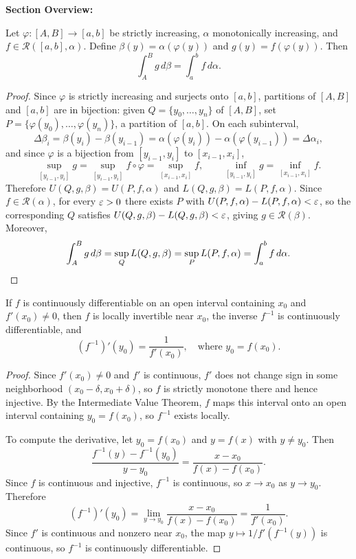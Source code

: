 \documentclass[../master/master.tex]{subfiles}
\begin{document}
\begin{summarybox}
\textbf{Section Overview:}
\end{summarybox}

\begin{theorem}
Let $\varphi:[A,B] \to [a,b]$ be strictly increasing, $\alpha$ monotonically increasing, and $f \in \mathscr{R}([a,b], \alpha)$. Define $\beta(y) = \alpha(\varphi(y))$ and $g(y) = f(\varphi(y))$. Then
\[
\int_A^B g\,d\beta = \int_a^b f\,d\alpha.
\]
\end{theorem}

\begin{proof}
Since $\varphi$ is strictly increasing and surjects onto $[a,b]$, partitions of $[A,B]$ and $[a,b]$ are in bijection: given $Q = \{y_0, \ldots, y_n\}$ of $[A,B]$, set $P = \{\varphi(y_0), \ldots, \varphi(y_n)\}$, a partition of $[a,b]$. On each subinterval,
\[
\Delta\beta_i = \beta(y_i) - \beta(y_{i-1}) = \alpha(\varphi(y_i)) - \alpha(\varphi(y_{i-1})) = \Delta\alpha_i,
\]
and since $\varphi$ is a bijection from $[y_{i-1}, y_i]$ to $[x_{i-1}, x_i]$,
\[
\sup_{[y_{i-1}, y_i]} g = \sup_{[y_{i-1}, y_i]} f \circ \varphi = \sup_{[x_{i-1}, x_i]} f, \qquad \inf_{[y_{i-1}, y_i]} g = \inf_{[x_{i-1}, x_i]} f.
\]
Therefore $U(Q, g, \beta) = U(P, f, \alpha)$ and $L(Q, g, \beta) = L(P, f, \alpha)$. Since $f \in \mathscr{R}(\alpha)$, for every $\varepsilon > 0$ there exists $P$ with $U(P,f,\alpha) - L(P,f,\alpha) < \varepsilon$, so the corresponding $Q$ satisfies $U(Q,g,\beta) - L(Q,g,\beta) < \varepsilon$, giving $g \in \mathscr{R}(\beta)$. Moreover,
\[
\int_A^B g\,d\beta = \sup_Q L(Q,g,\beta) = \sup_P L(P,f,\alpha) = \int_a^b f\,d\alpha. \qedhere
\]
\end{proof}

\begin{theorem}
If $f$ is continuously differentiable on an open interval containing $x_0$ and $f'(x_0) \neq 0$, then $f$ is locally invertible near $x_0$, the inverse $f^{-1}$ is continuously differentiable, and
\[
(f^{-1})'(y_0) = \frac{1}{f'(x_0)}, \quad \text{where } y_0 = f(x_0).
\]
\end{theorem}

\begin{proof}
Since $f'(x_0) \neq 0$ and $f'$ is continuous, $f'$ does not change sign in some neighborhood $(x_0 - \delta, x_0 + \delta)$, so $f$ is strictly monotone there and hence injective. By the Intermediate Value Theorem, $f$ maps this interval onto an open interval containing $y_0 = f(x_0)$, so $f^{-1}$ exists locally.

To compute the derivative, let $y_0 = f(x_0)$ and $y = f(x)$ with $y \neq y_0$. Then
\[
\frac{f^{-1}(y) - f^{-1}(y_0)}{y - y_0} = \frac{x - x_0}{f(x) - f(x_0)}.
\]
Since $f$ is continuous and injective, $f^{-1}$ is continuous, so $x \to x_0$ as $y \to y_0$. Therefore
\[
(f^{-1})'(y_0) = \lim_{y \to y_0} \frac{x - x_0}{f(x) - f(x_0)} = \frac{1}{f'(x_0)}.
\]
Since $f'$ is continuous and nonzero near $x_0$, the map $y \mapsto 1/f'(f^{-1}(y))$ is continuous, so $f^{-1}$ is continuously differentiable.
\end{proof}
\end{document}
